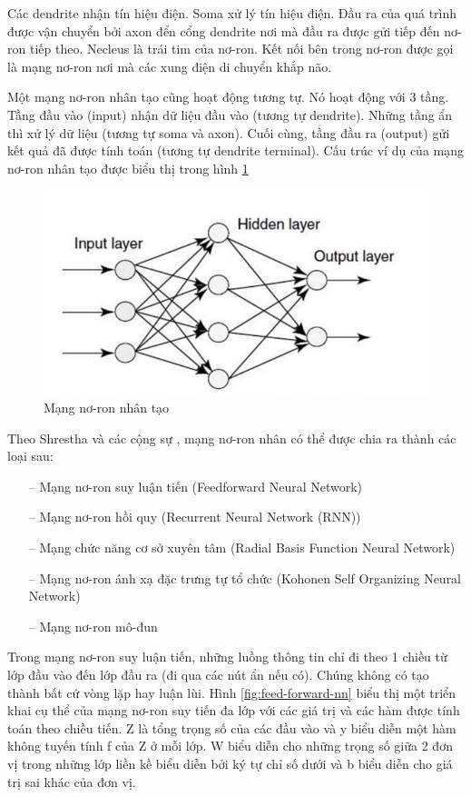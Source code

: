Các dendrite nhận tín hiệu điện. Soma xử lý tín hiệu điện. Đầu ra của quá trình được vận chuyển bởi axon đển cổng dendrite nơi mà đầu ra được gửi tiếp đến nơ-ron tiếp theo. Necleus là trái tim của nơ-ron. Kết nối bên trong nơ-ron được gọi là mạng nơ-ron nơi mà các xung điện di chuyển khắp não.

Một mạng nơ-ron nhân tạo cũng hoạt động tương tự. Nó hoạt động với 3 tầng. Tầng đầu vào (input) nhận dữ liệu đầu vào (tương tự dendrite). Những tầng ẩn thì xử lý dữ liệu (tương tự soma và axon). Cuối cùng, tầng đầu ra (output) gửi kết quả đã được tính toán (tương tự dendrite terminal). Cấu trúc ví dụ của mạng nơ-ron nhân tạo được biểu thị trong hình \ref{fig:cs-nn}

\begin{figure}[h]
	\centering
	\includegraphics[width=0.75\linewidth]{fig/cs-nn.png}
	\caption{Mạng nơ-ron nhân tạo}
	\label{fig:cs-nn}
\end{figure}

Theo Shrestha và các cộng sự \cite{62-Shrestha}, mạng nơ-ron nhân có thể được chia ra thành các loại sau:

\begin{itemize}
	\item[--] Mạng nơ-ron suy luận tiến (Feedforward Neural Network)
	\item[--] Mạng nơ-ron hồi quy (Recurrent Neural Network (RNN))
	\item[--] Mạng chức năng cơ sở xuyên tâm (Radial Basis Function Neural Network)
	\item[--] Mạng nơ-ron ánh xạ đặc trưng tự tổ chức (Kohonen Self Organizing Neural Network)
	\item[--] Mạng nơ-ron mô-đun
\end{itemize}

Trong mạng nơ-ron suy luận tiến, những luồng thông tin chỉ đi theo 1 chiều từ  lớp đầu vào đến lớp đầu ra (đi qua các nút ẩn nếu có). Chúng không có tạo thành bất cứ vòng lặp hay luận lùi. Hình \ref{fig:feed-forward-nn} biểu thị một triển khai cụ thể của mạng nơ-ron suy tiến đa lớp với các giá trị và các hàm được tính toán theo chiều tiến. Z là tổng trọng số của các đầu vào và y biểu diễn một hàm không tuyến tính f của Z ở mỗi lớp. W biểu diễn cho những trọng số giữa 2 đơn vị trong những lớp liền kề biểu diễn bởi ký tự chỉ số dưới và b biểu diễn cho giá trị sai khác của đơn vị.

